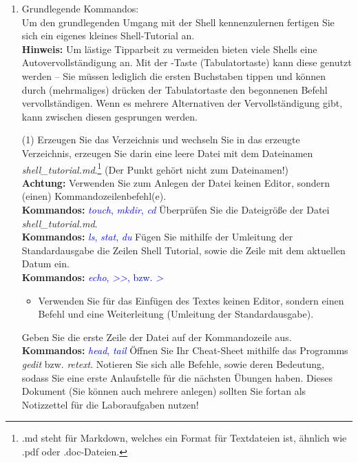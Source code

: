 \documentclass[paper=a4,fontsize=11pt]{scrartcl}%
\numberwithin{equation}{section}
\begin{document}
{\begin{enumerate}
\begin{itemize}
		\textbf{Kommandos:} \textcolor{blue}{\emph{cd}, \emph{pwd}, \emph{history}}
	\end{itemize}
  \item Grundlegende Kommandos:\\
  Um den grundlegenden Umgang mit der Shell kennenzulernen fertigen Sie sich ein eigenes kleines Shell-Tutorial an.\\
  \textbf{Hinweis:} Um lästige Tipparbeit zu vermeiden bieten viele Shells eine Autovervollständigung an. Mit der \keys{\tab}-Taste (Tabulatortaste) kann diese genutzt werden -- Sie müssen lediglich die ersten Buchstaben tippen und können durch (mehrmaliges) drücken der Tabulatortaste den begonnenen Befehl vervollständigen. Wenn es mehrere Alternativen der Vervollständigung gibt, kann zwischen diesen gesprungen werden.
        \begin{tasks}(1)
        \task Erzeugen Sie das Verzeichnis  und wechseln Sie in das erzeugte Verzeichnis, erzeugen Sie darin eine leere Datei mit dem Dateinamen \textit{shell\_tutorial.md}.\footnote{.md steht für Markdown, welches ein Format für Textdateien ist, ähnlich wie .pdf oder .doc-Dateien.} (Der Punkt gehört nicht zum Dateinamen!)\\
        \textbf{Achtung:} Verwenden Sie zum Anlegen der Datei keinen Editor, sondern (einen) Kommandozeilenbefehl(e).\\
        \textbf{Kommandos:} \textcolor{blue}{\emph{touch}, \emph{mkdir}, \emph{cd}}
		\task Überprüfen Sie die Dateigröße der Datei \textit{shell\_tutorial.md}.\\
		\textbf{Kommandos:} \textcolor{blue}{\emph{ls}, \emph{stat}, \emph{du}}
		\task Fügen Sie mithilfe der Umleitung der Standardausgabe die Zeilen \glqq Shell Tutorial\grqq, sowie die Zeile mit dem aktuellen Datum ein.\\
		\textbf{Kommandos:} \textcolor{blue}{\emph{echo}, \emph{>>}, bzw. \emph{>}}
		\begin{itemize}
			\item \small Verwenden Sie für das Einfügen des Textes keinen Editor, sondern einen Befehl und eine Weiterleitung (Umleitung der Standardausgabe).
		\end{itemize}
		\task Geben Sie die erste Zeile der Datei auf der Kommandozeile aus.\\
		\textbf{Kommandos:} \textcolor{blue}{\emph{head}, \emph{tail}}
		\task Öffnen Sie Ihr Cheat-Sheet mithilfe das Programms \emph{gedit} bzw. \emph{retext}. Notieren Sie sich alle Befehle, sowie deren Bedeutung, sodass Sie eine erste Anlaufstelle für die nächsten Übungen haben. Dieses Dokument (Sie können auch mehrere anlegen) sollten Sie fortan als Notizzettel für die Laboraufgaben nutzen!

\end{tasks}
\end{enumerate}}
\end{document}
